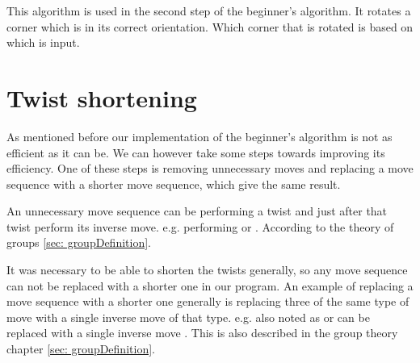 This algorithm is used in the second step of the beginner's algorithm. It rotates a corner \cpiece{} which is in its correct orientation. Which corner that is rotated is based on which is input. 









\section{Twist shortening}
As mentioned before our implementation of the beginner's algorithm is not as efficient as it can be. We can however take some steps towards improving its efficiency. One of these steps is removing unnecessary moves and replacing a move sequence with a shorter move sequence, which give the same result.

An unnecessary move sequence can be performing a twist and just after that twist perform its inverse move. e.g. performing  or .
According to the theory of groups \ref{sec: groupDefinition}.

It was necessary to be able to shorten the twists generally, so any move sequence can not be replaced with a shorter one in our program.
An example of replacing a move sequence with a shorter one generally is replacing three of the same type of move with a single inverse move of that type. e.g.  also noted as  or  can be replaced with a single inverse move . This is also described in the group theory chapter \ref{sec: groupDefinition}.

